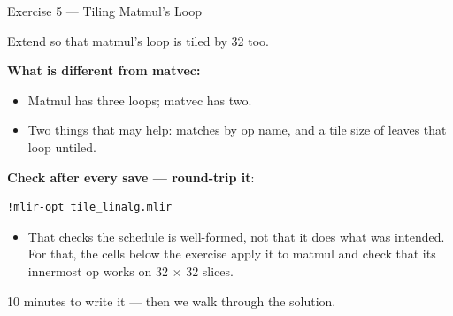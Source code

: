 \documentclass[aspectratio=169,10pt]{beamer}
\begin{document}
\begin{frame}[fragile]{Exercise 5 --- Tiling Matmul's  Loop}
  \begin{center}\large
    Extend  so that matmul's  loop is
    tiled by 32 too.
  \end{center}
  \vspace{0.1em}
  \textbf{What is different from matvec:}
  \begin{itemize}
    \item Matmul has three loops; matvec has two.
    \item Two things that may help:  matches by op name, and a tile size of
       leaves that loop untiled.
  \end{itemize}
  \vspace{0.4em}
  \textbf{Check after every save --- round-trip it}:
\begin{lstlisting}[style=plain,basicstyle=\ttfamily\small]
!mlir-opt tile_linalg.mlir
\end{lstlisting}
  \vspace{0.1em}
  \begin{itemize}
    \item That checks the schedule is well-formed, not that it does what was
      intended. For that, the cells below the exercise apply it to matmul and
      check that its innermost op works on 32 $\times$ 32 slices.
  \end{itemize}
  \vspace{0.4em}
  \begin{center}\color{scaccent}\large
    10 minutes to write it --- then we walk through the solution.
  \end{center}
\end{frame}
\end{document}
